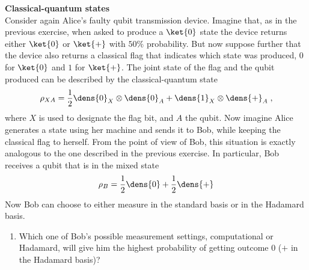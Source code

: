 \begin{exercises}
\begin{enumerate}
\end{enumerate}


\item {\bf Classical-quantum states}\\
Consider again Alice's faulty qubit transmission device. Imagine that, as in the previous exercise, when asked to produce a $\ket{0}$ state the device returns either $\ket{0}$ or $\ket{+}$ with $50\%$ probability. But now suppose further that the device also returns a classical flag that indicates which state was produced, $0$ for $\ket{0}$ and $1$ for $\ket{+}$. The joint state of the flag and the qubit produced can be described by the classical-quantum state
\begin{equation}
\rho_{XA} = \frac{1}{2}\dens{0}_X \otimes\dens{0}_A + \dens{1}_X\otimes \dens{+}_A\;,
\end{equation}
where $X$ is used to designate the flag bit, and $A$ the qubit. 
Now imagine Alice generates a state using her machine and sends it to Bob, while keeping the classical flag to herself. From the point of view of Bob, this situation is exactly analogous to the one described in the previous exercise. In particular, Bob receives a qubit that is in the mixed state
\begin{equation}
\rho_B = \frac{1}{2}\dens{0}+ \frac{1}{2}\dens{+}
\end{equation}
Now Bob can choose to either measure in the standard basis or in the Hadamard basis.
\begin{enumerate}
\item Which one of Bob's possible measurement settings, computational or Hadamard, will give him the highest probability of getting outcome $0$ ($+$ in the Hadamard basis)?

\end{enumerate}
\end{exercises}
